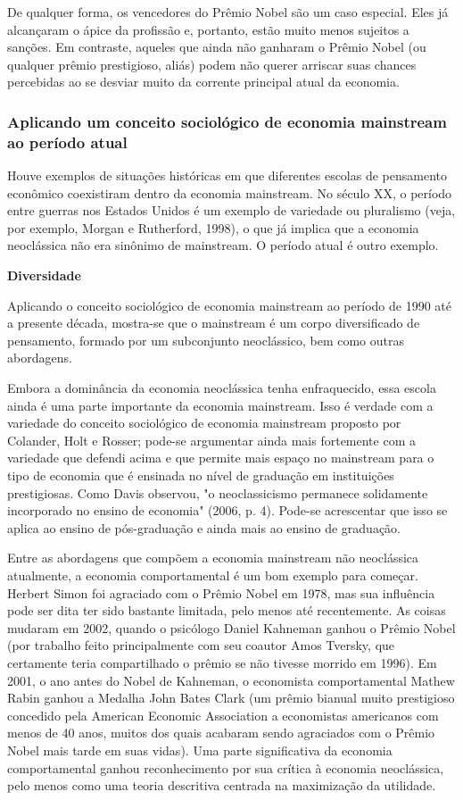 \documentclass[a4paper,12pt]{article}[abntex2]
\begin{document}
De qualquer forma, os vencedores do Prêmio Nobel são um caso especial. Eles já alcançaram o ápice da profissão e, portanto, estão muito menos sujeitos a sanções. Em contraste, aqueles que ainda não ganharam o Prêmio Nobel (ou qualquer prêmio prestigioso, aliás) podem não querer arriscar suas chances percebidas ao se desviar muito da corrente principal atual da economia.

\subsubsection{\textbf{Aplicando um conceito sociológico de economia mainstream ao período atual}}

Houve exemplos de situações históricas em que diferentes escolas de pensamento econômico coexistiram dentro da economia mainstream. No século XX, o período entre guerras nos Estados Unidos é um exemplo de variedade ou pluralismo (veja, por exemplo, Morgan e Rutherford, 1998), o que já implica que a economia neoclássica não era sinônimo de mainstream. O período atual é outro exemplo.

\textbf{Diversidade}

Aplicando o conceito sociológico de economia mainstream ao período de 1990 até a presente década, mostra-se que o mainstream é um corpo diversificado de pensamento, formado por um subconjunto neoclássico, bem como outras abordagens.

Embora a dominância da economia neoclássica tenha enfraquecido, essa escola ainda é uma parte importante da economia mainstream. Isso é verdade com a variedade do conceito sociológico de economia mainstream proposto por Colander, Holt e Rosser; pode-se argumentar ainda mais fortemente com a variedade que defendi acima e que permite mais espaço no mainstream para o tipo de economia que é ensinada no nível de graduação em instituições prestigiosas. Como Davis observou, "o neoclassicismo permanece solidamente incorporado no ensino de economia" (2006, p. 4). Pode-se acrescentar que isso se aplica ao ensino de pós-graduação e ainda mais ao ensino de graduação.

Entre as abordagens que compõem a economia mainstream não neoclássica atualmente, a economia comportamental é um bom exemplo para começar. Herbert Simon foi agraciado com o Prêmio Nobel em 1978, mas sua influência pode ser dita ter sido bastante limitada, pelo menos até recentemente. As coisas mudaram em 2002, quando o psicólogo Daniel Kahneman ganhou o Prêmio Nobel (por trabalho feito principalmente com seu coautor Amos Tversky, que certamente teria compartilhado o prêmio se não tivesse morrido em 1996). Em 2001, o ano antes do Nobel de Kahneman, o economista comportamental Mathew Rabin ganhou a Medalha John Bates Clark (um prêmio bianual muito prestigioso concedido pela American Economic Association a economistas americanos com menos de 40 anos, muitos dos quais acabaram sendo agraciados com o Prêmio Nobel mais tarde em suas vidas). Uma parte significativa da economia comportamental ganhou reconhecimento por sua crítica à economia neoclássica, pelo menos como uma teoria descritiva centrada na maximização da utilidade.
\end{document}
